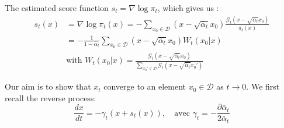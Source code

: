 \documentclass[a4paper,10pt]{article}
\theoremstyle{definition} %
\theoremstyle{definition} %
\theoremstyle{definition} %
\theoremstyle{definition} %
\newcommand{\0}{\boldsymbol{0}}
\begin{document}
The estimated score function $s_t = \nabla \log \pi_t$, which gives us 
:\begin{align*}
s_t(x) &= \nabla \log \pi_t(x) = -\sum\limits_{x_0  \in \mathcal{D}} (x - \sqrt{\bar \alpha_t}x_0) \frac{\mathcal{G}_t(x - \sqrt{\bar \alpha_t}x_0)}{\pi_t(x)} \\
&= -\frac{1}{1-\bar \alpha_t} \sum\limits_{x_0  \in \mathcal{D}} (x - \sqrt{\bar \alpha_t}x_0) W_t(x_0 | x) \\
& \text{with }W_t(x_0| x) = \frac{\mathcal{G}_t(x - \sqrt{ \bar \alpha_t}x_0)}{\sum\limits_{x_0'  \in \mathcal{D}} \mathcal{G}_t(x - \sqrt{\bar \alpha_t}x_0')}
\end{align*}

Our aim is to show that $x_t$ converge to an element $x_0 \in \mathcal{D}$ as $t \rightarrow 0$. We first recall the reverse process:
\begin{equation*}
    \frac{dx}{dt} =  -\gamma_t(x+s_t(x)), \quad \text{avec } \gamma_t = -\frac{\partial \bar \alpha_t}{2\bar \alpha_t} 
\end{equation*}
\end{document}
